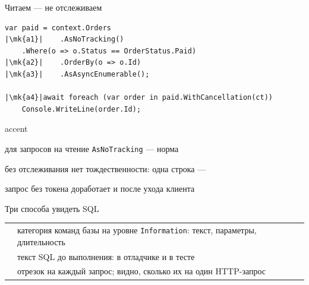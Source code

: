 \documentclass[aspectratio=169,10pt,t]{beamer}
\newcommand{\codesm}{\ttfamily\fontsize{7.6}{9.0}\selectfont}
\newcommand{\mk}[1]{\tikz[remember picture,overlay]\coordinate (#1) at (0,0.55ex);}
\begin{document}
\begin{frame}[fragile]{Читаем --- не отслеживаем}
  \slidetop
\begin{lstlisting}[style=csharp,basicstyle=\codesm,escapechar=|]
var paid = context.Orders
|\mk{a1}|    .AsNoTracking()
    .Where(o => o.Status == OrderStatus.Paid)
|\mk{a2}|    .OrderBy(o => o.Id)
|\mk{a3}|    .AsAsyncEnumerable();

|\mk{a4}|await foreach (var order in paid.WithCancellation(ct))
    Console.WriteLine(order.Id);
\end{lstlisting}

  \slidegap
  \begin{cbul}{accent}
    \item для запросов на чтение \texttt{AsNoTracking} --- норма
    \item без отслеживания нет тождественности: одна строка --- 
    \item запрос без токена доработает и после ухода клиента
  \end{cbul}
\end{frame}

\begin{frame}[plain]
\end{frame}

\begin{frame}{Три способа увидеть SQL}
  \slidetop

  {\renewcommand{\arraystretch}{1.6}
  \begin{tabular}{@{}L{3.6cm}L{9.2cm}@{}}
                        & категория команд базы на уровне
      \texttt{Information}: текст, параметры, длительность \\
     & текст SQL до выполнения: в отладчике и
      в тесте \\
                    & отрезок на каждый запрос; видно, сколько
      их на один HTTP-запрос \\
  \end{tabular}}

  \slidegap
\end{frame}
\end{document}
